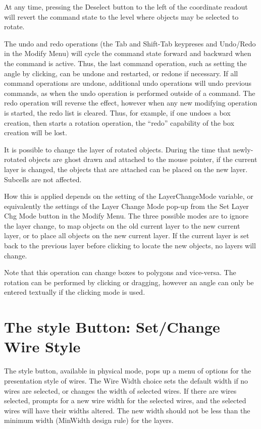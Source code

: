 At any time, pressing the {\cb Deselect} button to the left of the
coordinate readout will revert the command state to the level where
objects may be selected to rotate.

The undo and redo operations (the {\kb Tab} and {\kb Shift-Tab}
keypreses and {\cb Undo}/{\cb Redo} in the {\cb Modify Menu}) will
cycle the command state forward and backward when the command is
active.  Thus, the last command operation, such as setting the angle
by clicking, can be undone and restarted, or redone if necessary.  If
all command operations are undone, additional undo operations will
undo previous commands, as when the undo operation is performed
outside of a command.  The redo operation will reverse the effect,
however when any new modifying operation is started, the redo list is
cleared.  Thus, for example, if one undoes a box creation, then starts
a rotation operation, the ``redo'' capability of the box creation will
be lost.

It is possible to change the layer of rotated objects.  During the
time that newly-rotated objects are ghost drawn and attached to the
mouse pointer, if the current layer is changed, the objects that are
attached can be placed on the new layer.  Subcells are not affected. 

How this is applied depends on the setting of the {\et
LayerChangeMode} variable, or equivalently the settings of the {\cb
Layer Change Mode} pop-up from the {\cb Set Layer Chg Mode} button
in the {\cb Modify Menu}.  The three possible modes are to ignore the
layer change, to map objects on the old current layer to the new
current layer, or to place all objects on the new current layer.  If
the current layer is set back to the previous layer before clicking to
locate the new objects, no layers will change.

Note that this operation can change boxes to polygons and vice-versa. 
The rotation can be performed by clicking or dragging, however an
angle can only be entered textually if the clicking mode is used. 


\section{The {\cb style} Button: Set/Change Wire Style}

The {\cb style} button, available in physical mode, pops up a menu of
options for the presentation style of wires.  The {\cb Wire Width}
choice sets the default width if no wires are selected, or changes the
width of selected wires.  If there are wires selected, {\Xic} prompts
for a new wire width for the selected wires, and the selected wires
will have their widths altered.  The new width should not be less than
the minimum width ({\et MinWidth} design rule) for the layers.

